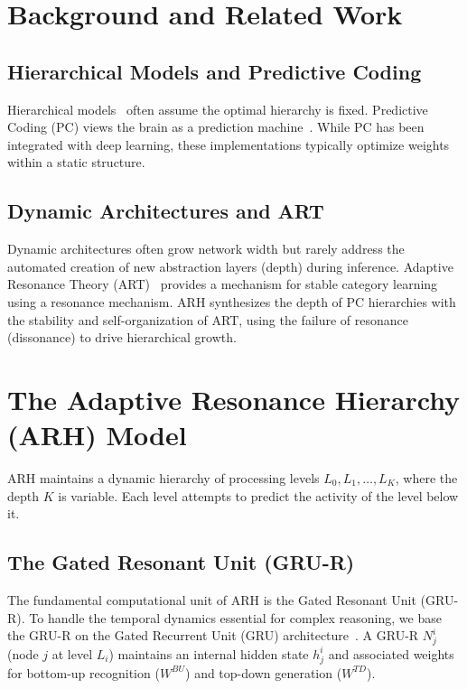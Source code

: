 \documentclass{article}
\begin{document}
\section{Background and Related Work}

\subsection{Hierarchical Models and Predictive Coding}
Hierarchical models~\cite{Sutton1999, HRM2025} often assume the optimal hierarchy is fixed. Predictive Coding (PC) views the brain as a prediction machine~\cite{Rao1999}. While PC has been integrated with deep learning, these implementations typically optimize weights within a static structure.

\subsection{Dynamic Architectures and ART}
Dynamic architectures often grow network width but rarely address the automated creation of new abstraction layers (depth) during inference. Adaptive Resonance Theory (ART)~\cite{Grossberg1987} provides a mechanism for stable category learning using a resonance mechanism. ARH synthesizes the depth of PC hierarchies with the stability and self-organization of ART, using the failure of resonance (dissonance) to drive hierarchical growth.

\section{The Adaptive Resonance Hierarchy (ARH) Model}

ARH maintains a dynamic hierarchy of processing levels $L_0, L_1, \dots, L_K$, where the depth $K$ is variable. Each level attempts to predict the activity of the level below it.

\subsection{The Gated Resonant Unit (GRU-R)}
The fundamental computational unit of ARH is the Gated Resonant Unit (GRU-R). To handle the temporal dynamics essential for complex reasoning, we base the GRU-R on the Gated Recurrent Unit (GRU) architecture~\cite{gru2014}. A GRU-R $N_j^i$ (node $j$ at level $L_i$) maintains an internal hidden state $h_j^i$ and associated weights for bottom-up recognition ($W^{BU}$) and top-down generation ($W^{TD}$).
\end{document}
